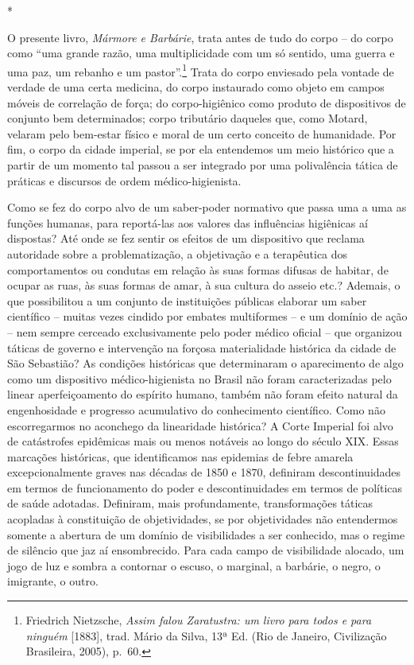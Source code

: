 *

O presente livro, \emph{Mármore e Barbárie}, trata antes de tudo do
corpo -- do corpo como ``uma grande razão, uma multiplicidade com um só
sentido, uma guerra e uma paz, um rebanho e um pastor''.\footnote{Friedrich
  Nietzsche, \emph{Assim falou Zaratustra: um livro para todos e para
  ninguém} {[}1883{]}, trad. Mário da Silva, 13ª Ed. (Rio de Janeiro,
  Civilização Brasileira, 2005), p.~60.} Trata do corpo enviesado pela
vontade de verdade de uma certa medicina, do corpo instaurado como
objeto em campos móveis de correlação de força; do corpo-higiênico como
produto de dispositivos de conjunto bem determinados; corpo tributário
daqueles que, como Motard, velaram pelo bem-estar físico e moral de um
certo conceito de humanidade. Por fim, o corpo da cidade imperial, se
por ela entendemos um meio histórico que a partir de um momento tal
passou a ser integrado por uma polivalência tática de práticas e
discursos de ordem médico-higienista.

Como se fez do corpo alvo de um saber-poder normativo que passa uma a
uma as funções humanas, para reportá-las aos valores das influências
higiênicas aí dispostas? Até onde se fez sentir os efeitos de um
dispositivo que reclama autoridade sobre a problematização, a
objetivação e a terapêutica dos comportamentos ou condutas em relação às
suas formas difusas de habitar, de ocupar as ruas, às suas formas de
amar, à sua cultura do asseio etc.? Ademais, o que possibilitou a um
conjunto de instituições públicas elaborar um saber científico -- muitas
vezes cindido por embates multiformes -- e um domínio de ação -- nem
sempre cerceado exclusivamente pelo poder médico oficial -- que
organizou táticas de governo e intervenção na forçosa materialidade
histórica da cidade de São Sebastião? As condições históricas que
determinaram o aparecimento de algo como um dispositivo
médico-higienista no Brasil não foram caracterizadas pelo linear
aperfeiçoamento do espírito humano, também não foram efeito natural da
engenhosidade e progresso acumulativo do conhecimento científico. Como
não escorregarmos no aconchego da linearidade histórica? A Corte
Imperial foi alvo de catástrofes epidêmicas mais ou menos notáveis ao
longo do século XIX. Essas marcações históricas, que identificamos nas
epidemias de febre amarela excepcionalmente graves nas décadas de 1850 e
1870, definiram descontinuidades em termos de funcionamento do poder e
descontinuidades em termos de políticas de saúde adotadas. Definiram,
mais profundamente, transformações táticas acopladas à constituição de
objetividades, se por objetividades não entendermos somente a abertura
de um domínio de visibilidades a ser conhecido, mas o regime de silêncio
que jaz aí ensombrecido. Para cada campo de visibilidade alocado, um
jogo de luz e sombra a contornar o escuso, o marginal, a barbárie, o
negro, o imigrante, o outro.

